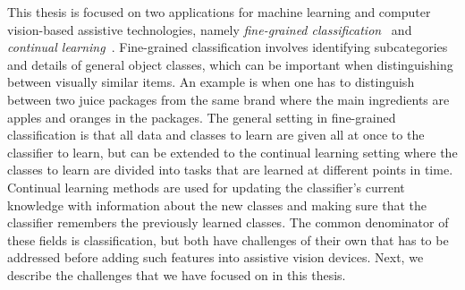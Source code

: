 This thesis is focused on two applications for machine learning and computer vision-based assistive technologies, namely \textit{fine-grained classification}~\cite{wei2021fine} and \textit{continual learning}~\cite{delange2021continual, parisi2019continual}. Fine-grained classification involves identifying subcategories and details of general object classes, which can be important when distinguishing between visually similar items. An example is when one has to distinguish between two juice packages from the same brand where the main ingredients are apples and oranges in the packages. The general setting in fine-grained classification is that all data and classes to learn are given all at once to the classifier to learn, but can be extended to the continual learning setting where the classes to learn are divided into tasks that are learned at different points in time. Continual learning methods are used for updating the classifier's current knowledge with information about the new classes and making sure that the classifier remembers the previously learned classes. The common denominator of these fields is classification, but both have challenges of their own that has to be addressed before adding such features into assistive vision devices. Next, we describe the challenges that we have focused on in this thesis. 


